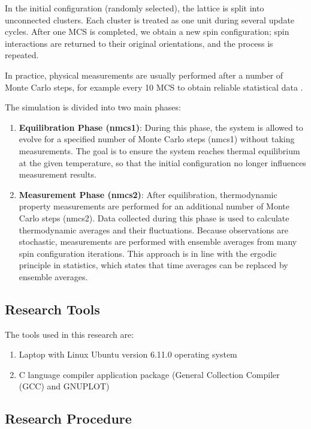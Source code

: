 In the initial configuration (randomly selected), the lattice is split into unconnected clusters. Each cluster is treated as one unit during several update cycles. After one MCS is completed, we obtain a new spin configuration; spin interactions are returned to their original orientations, and the process is repeated.

In practice, physical measurements are usually performed after a number of Monte Carlo steps, for example every 10 MCS to obtain reliable statistical data \cite{Surungan2017}.

The simulation is divided into two main phases:

\begin{enumerate}
\item \textbf{Equilibration Phase (nmcs1)}: During this phase, the system is allowed to evolve for a specified number of Monte Carlo steps (nmcs1) without taking measurements. The goal is to ensure the system reaches thermal equilibrium at the given temperature, so that the initial configuration no longer influences measurement results.

\item \textbf{Measurement Phase (nmcs2)}: After equilibration, thermodynamic property measurements are performed for an additional number of Monte Carlo steps (nmcs2). Data collected during this phase is used to calculate thermodynamic averages and their fluctuations. Because observations are stochastic, measurements are performed with ensemble averages from many spin configuration iterations. This approach is in line with the ergodic principle in statistics, which states that time averages can be replaced by ensemble averages.
\end{enumerate}

\subsection{Research Tools}

The tools used in this research are:
\begin{enumerate}
\item Laptop with Linux Ubuntu version 6.11.0 operating system
\item C language compiler application package (General Collection Compiler (GCC) and GNUPLOT)
\end{enumerate}

\subsection{Research Procedure}

